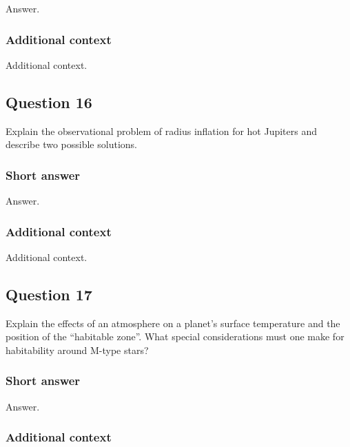 \documentclass[a4paper,10pt]{article}
\begin{document}
Answer.

\subsubsection{Additional context}

Additional context.


\newpage
\subsection{Question 16}

Explain the observational problem of radius inflation for hot Jupiters and describe two possible solutions.

\subsubsection{Short answer}

Answer.

\subsubsection{Additional context}

Additional context.


\newpage
\subsection{Question 17}

Explain the effects of an atmosphere on a planet's surface temperature and the position of the “habitable zone”. What special considerations must one make for habitability around M-type stars?

\subsubsection{Short answer}

Answer.

\subsubsection{Additional context}
\end{document}
